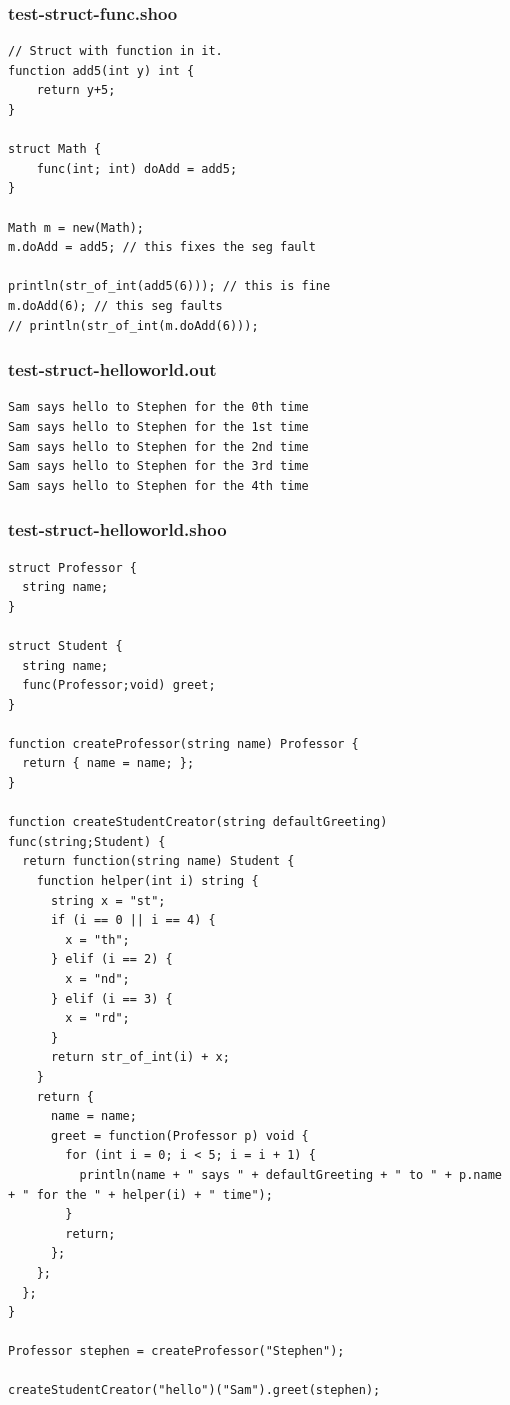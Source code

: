 \documentclass[12pt]{article}
\begin{document}
\subsubsection{test-struct-func.shoo}
\begin{mdframed}[hidealllines=true,backgroundcolor=blue!10]
\begin{lstlisting}
// Struct with function in it.
function add5(int y) int {
    return y+5;
}

struct Math {
    func(int; int) doAdd = add5;
}

Math m = new(Math);
m.doAdd = add5; // this fixes the seg fault

println(str_of_int(add5(6))); // this is fine
m.doAdd(6); // this seg faults
// println(str_of_int(m.doAdd(6)));
\end{lstlisting}
\end{mdframed}
\subsubsection{test-struct-helloworld.out}
\begin{mdframed}[hidealllines=true,backgroundcolor=green!10]
\begin{lstlisting}
Sam says hello to Stephen for the 0th time
Sam says hello to Stephen for the 1st time
Sam says hello to Stephen for the 2nd time
Sam says hello to Stephen for the 3rd time
Sam says hello to Stephen for the 4th time
\end{lstlisting}
\end{mdframed}
\subsubsection{test-struct-helloworld.shoo}
\begin{mdframed}[hidealllines=true,backgroundcolor=blue!10]
\begin{lstlisting}
struct Professor {
  string name;
}

struct Student {
  string name;
  func(Professor;void) greet;
}

function createProfessor(string name) Professor {
  return { name = name; };
}

function createStudentCreator(string defaultGreeting) func(string;Student) {
  return function(string name) Student {
    function helper(int i) string {
      string x = "st";
      if (i == 0 || i == 4) {
        x = "th";
      } elif (i == 2) {
        x = "nd";
      } elif (i == 3) {
        x = "rd";
      }
      return str_of_int(i) + x;
    }
    return {
      name = name;
      greet = function(Professor p) void {
        for (int i = 0; i < 5; i = i + 1) {
          println(name + " says " + defaultGreeting + " to " + p.name + " for the " + helper(i) + " time");
        }
        return;
      };
    };
  };
}

Professor stephen = createProfessor("Stephen");

createStudentCreator("hello")("Sam").greet(stephen);\end{lstlisting}
\end{mdframed}
\end{document}
